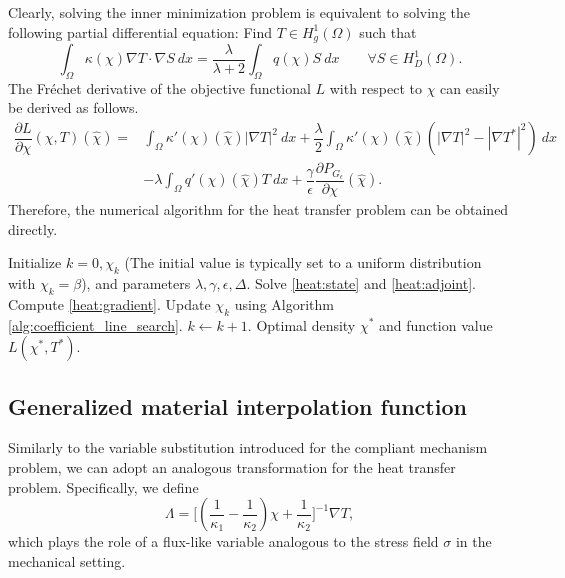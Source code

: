 \documentclass{amsart}
\begin{document}
Clearly, solving the inner minimization problem is equivalent to solving the following partial differential equation: Find $T\in H_g^1(\Omega)$ such that   
\begin{equation}\label{heat:adjoint}
 \int_\Omega\kappa(\chi)\nabla T\cdot \nabla S\ dx=\dfrac{\lambda}{\lambda+2}\int_\Omega q(\chi)S\ dx\qquad\forall S\in H_D^1(\Omega).
\end{equation}
The Fréchet derivative of the objective functional $L $ with respect to \(\chi\) can easily be  derived as follows.
\begin{align}\label{heat:gradient}
    \dfrac{\partial L}{\partial \chi}(\chi,T)(\hat{\chi})=&\int_\Omega \kappa'(\chi)(\hat{\chi})|\nabla T|^2\ dx+\dfrac{\lambda}{2}\int_\Omega\kappa'(\chi)(\hat{\chi})(|\nabla T|^2-|\nabla T^*|^2)\ dx\nonumber\\
    &-\lambda\int_\Omega q'(\chi)(\hat{\chi})T\ dx+\dfrac{\gamma}{\epsilon}\dfrac{\partial P_{G_\epsilon}}{\partial\chi}(\hat{\chi}).
\end{align}
Therefore, the numerical algorithm for the heat transfer problem can be obtained directly.
\begin{algorithm}
\caption{Gradient descent algorithm for the heat transfer problem}
\label{alg:monotonic_descen_with_penlty_heat}
\begin{algorithmic}[1]
\STATE Initialize $k=0,\chi_k$ (The initial value is typically set to a uniform distribution with $ \chi_k = \beta $),  and parameters $\lambda,\gamma,\epsilon,\Delta$.
    \STATE Solve \eqref{heat:state} and \eqref{heat:adjoint}.
    \STATE Compute \eqref{heat:gradient}.
    \STATE Update \( \chi_{k}\) using Algorithm \ref{alg:coefficient_line_search}.
    \STATE $k\leftarrow k+1$.
\ENDWHILE
\RETURN Optimal density \( \chi^* \) and function value $L(\chi^*,T^*)$.
\end{algorithmic}
\end{algorithm}

\subsection{Generalized material interpolation function}
Similarly to the variable substitution introduced for the compliant mechanism problem, we can adopt an analogous transformation for the heat transfer problem. Specifically, we define
\begin{equation}
    \Lambda = \Big[ \left( \frac{1}{\kappa_1} - \frac{1}{\kappa_2} \right) \chi + \frac{1}{\kappa_2} \Big]^{-1} \nabla T,
\end{equation}
which plays the role of a flux-like variable analogous to the stress field $\sigma$ in the mechanical setting.
\end{document}
